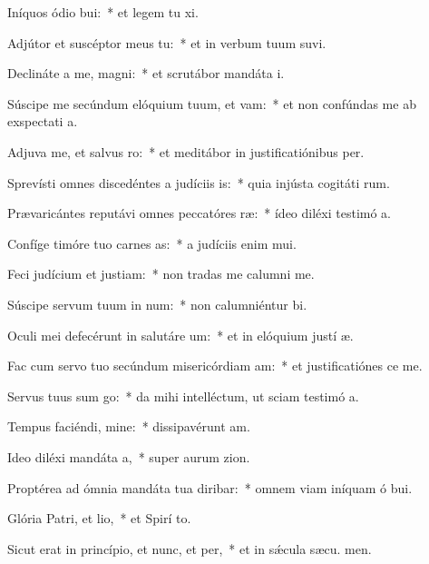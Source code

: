 \item Iníquos ódio bui:~* et legem tu xi.
\item Adjútor et suscéptor meus  tu:~* et in verbum tuum suvi.
\item Declináte a me, magni:~* et scrutábor mandáta  i.
\item Súscipe me secúndum elóquium tuum, et vam:~* et non confúndas me ab exspectati a.
\item Adjuva me, et salvus ro:~* et meditábor in justificatiónibus  per.
\item Sprevísti omnes discedéntes a judíciis is:~* quia injústa cogitáti rum.
\item Prævaricántes reputávi omnes peccatóres ræ:~* ídeo diléxi testimó a.
\item Confíge timóre tuo carnes as:~* a judíciis enim  mui.
\item Feci judícium et justiam:~* non tradas me calumni me.
\item Súscipe servum tuum in num:~* non calumniéntur  bi.
\item Oculi mei defecérunt in salutáre um:~* et in elóquium justí æ.
\item Fac cum servo tuo secúndum misericórdiam am:~* et justificatiónes  ce me.
\item Servus tuus sum go:~* da mihi intelléctum, ut sciam testimó a.
\item Tempus faciéndi, mine:~* dissipavérunt  am.
\item Ideo diléxi mandáta a,~* super aurum  zion.
\item Proptérea ad ómnia mandáta tua diribar:~* omnem viam iníquam ó bui.
\item Glória Patri, et lio,~* et Spirí to.
\item Sicut erat in princípio, et nunc, et per,~* et in sǽcula sæcu. men.
